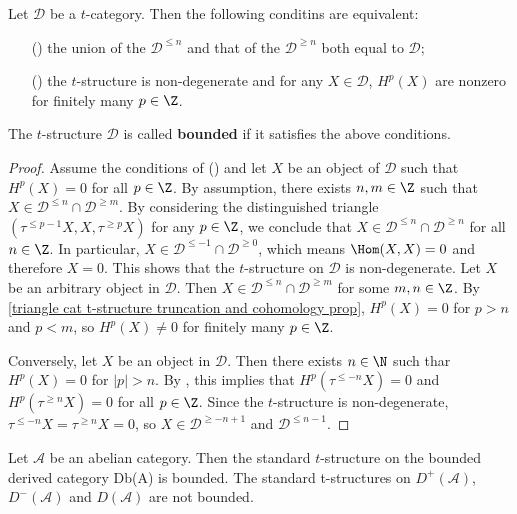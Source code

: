 \begin{proposition}\label{triangle cat t-structure bounded iff}
Let $\mathcal{D}$ be a $t$-category. Then the following conditins are equivalent:
\begin{enumerate}
    \item[(\rmnum{1})] the union of the $\mathcal{D}^{\leq n}$ and that of the $\mathcal{D}^{\geq n}$ both equal to $\mathcal{D}$;
    \item[(\rmnum{2})] the $t$-structure is non-degenerate and for any $X\in\mathcal{D}$, $H^p(X)$ are nonzero for finitely many $p\in\Z$.
\end{enumerate}
The $t$-structure $\mathcal{D}$ is called \textbf{bounded} if it satisfies the above conditions.
\end{proposition}
\begin{proof}
Assume the conditions of () and let $X$ be an object of $\mathcal{D}$ such that $H^p(X)=0$ for all $p\in\Z$. By assumption, there exists $n,m\in\Z$ such that $X\in\mathcal{D}^{\leq n}\cap\mathcal{D}^{\geq m}$. By considering the distinguished triangle $(\tau^{\leq p-1}X,X,\tau^{\geq p}X)$ for any $p\in\Z$, we conclude that $X\in\mathcal{D}^{\leq n}\cap\mathcal{D}^{\geq n}$ for all $n\in\Z$. In particular, $X\in\mathcal{D}^{\leq-1}\cap\mathcal{D}^{\geq 0}$, which means $\Hom(X,X)=0$ and therefore $X=0$. This shows that the $t$-structure on $\mathcal{D}$ is non-degenerate. Let $X$ be an arbitrary object in $\mathcal{D}$. Then $X\in\mathcal{D}^{\leq n}\cap\mathcal{D}^{\geq m}$ for some $m,n\in\Z$. By \cref{triangle cat t-structure truncation and cohomology prop}, $H^p(X)=0$ for $p>n$ and $p<m$, so $H^p(X)\neq 0$ for finitely many $p\in\Z$.\par
Conversely, let $X$ be an object in $\mathcal{D}$. Then there exists $n\in\N$ such thar $H^p(X)=0$ for $|p|>n$. By , this implies that $H^p(\tau^{\leq -n}X)=0$ and $H^p(\tau^{\geq n}X)=0$ for all $p\in\Z$. Since the $t$-structure is non-degenerate, $\tau^{\leq -n}X=\tau^{\geq n}X=0$, so $X\in\mathcal{D}^{\geq -n+1}$ and $\mathcal{D}^{\leq n-1}$.
\end{proof}
\begin{example}
Let $\mathcal{A}$ be an abelian category. Then the standard $t$-structure on the bounded derived category Db(A) is bounded. The standard t-structures on $D^+(\mathcal{A})$, $D^-(\mathcal{A})$ and $D(\mathcal{A})$ are not bounded.
\end{example}
